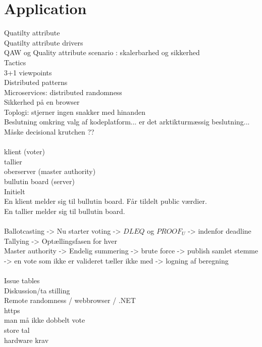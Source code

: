 \part{Application}


\noindent
Quatilty attribute\\
Quatilty attribute drivers\\
QAW og Quality attribute scenario : skalerbarhed og sikkerhed\\
Tactics\\
3+1 viewpoints\\
Distributed patterns\\
Microservices: distributed randomness\\
Sikkerhed på en browser\\
Toplogi: stjerner ingen snakker med hinanden\\
Beslutning omkring valg af kodeplatform... er det arktikturmæssig beslutning... Måske decisional krutchen ??\\\\

\noindent
klient (voter)\\
tallier\\
oberserver (master authority)\\
bullutin board (server)\\
\noindent
Initielt\\
En klient melder sig til bullutin board. Får tildelt public værdier. \\
En tallier melder sig til bullutin board. \\\\
\noindent
Ballotcasting -> Nu starter voting ->  $DLEQ$ og $PROOF_U$ -> indenfor deadline\\
Tallying -> Optællingsfasen for hver \\
Master authority -> Endelig summering -> brute force -> publish samlet stemme -> en vote som ikke er valideret tæller ikke med -> logning af beregning \\\\

\noindent
Issue tables\\
Diskussion/ta stilling \\
Remote randomness / webbrowser / .NET\\
https\\
man må ikke dobbelt vote\\
store tal\\
hardware krav